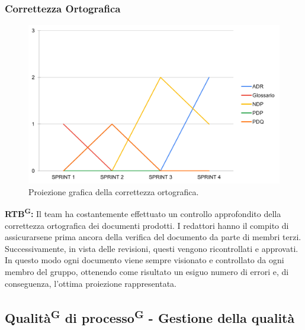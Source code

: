 \documentclass[8pt]{article}
\newcommand{\glossterm}[1]{#1\textsuperscript{G}} %
\begin{document}
\subsubsection{Correttezza Ortografica}
\begin{figure}[h!]
    \centering
    \includegraphics[width=1\textwidth]{images_pdq/CO.png}
    \caption{Proiezione grafica della correttezza ortografica.}
    \label{fig:Proiezione grafica della correttezza ortografica}
\end{figure}
\textbf{\glossterm{RTB}:} Il team ha costantemente effettuato un controllo approfondito della correttezza ortografica dei documenti prodotti. I redattori hanno il compito di assicurarsene prima ancora della verifica del documento da parte di membri terzi. Successivamente, in vista delle revisioni, questi vengono ricontrollati e approvati. In questo modo ogni documento viene sempre visionato e controllato da ogni membro del gruppo, ottenendo come risultato un esiguo numero di errori e, di conseguenza, l'ottima proiezione rappresentata.
\clearpage
\subsection{\glossterm{Qualità} di \glossterm{processo} - Gestione della qualità}
\end{document}
